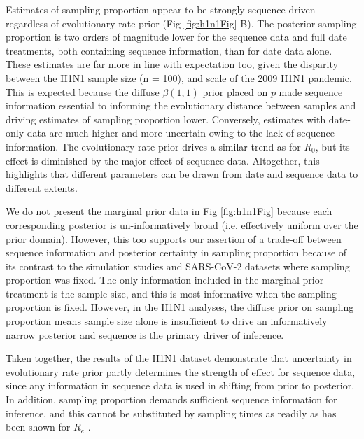 \documentclass{article}
\begin{document}
Estimates of sampling proportion appear to be strongly sequence driven regardless of evolutionary rate prior (Fig \ref{fig:h1n1Fig} B). The posterior sampling proportion is two orders of magnitude lower for the sequence data and full date treatments, both containing sequence information, than for date data alone. These estimates are far more in line with expectation too, given the disparity between the H1N1 sample size (n = 100), and scale of the 2009 H1N1 pandemic. This is expected because the diffuse $\beta(1, 1)$ prior placed on $p$ made sequence information essential to informing the evolutionary distance between samples and driving estimates of sampling proportion lower. Conversely, estimates with date-only data are much higher and more uncertain owing to the lack of sequence information. The evolutionary rate prior drives a similar trend as for $R_0$, but its effect is diminished by the major effect of sequence data. Altogether, this  highlights that different parameters can be drawn from date and sequence data to different extents. 

We do not present the marginal prior data in Fig \ref{fig:h1n1Fig} because each corresponding posterior is un-informatively broad (i.e. effectively uniform over the prior domain). However, this too supports our assertion of a trade-off between sequence information and posterior certainty in sampling proportion because of its contrast to the simulation studies and SARS-CoV-2 datasets where sampling proportion was fixed. The only information included in the marginal prior treatment is the sample size, and this is most informative when the sampling proportion is fixed. However, in the H1N1 analyses, the diffuse prior on sampling proportion means sample size alone is insufficient to drive an informatively narrow posterior and sequence is the primary driver of inference.

Taken together, the results of the H1N1 dataset demonstrate that uncertainty in evolutionary rate prior partly determines the strength of effect for sequence data, since any information in sequence data is used in shifting from prior to posterior. In addition, sampling proportion demands sufficient sequence information for inference, and this cannot be substituted by sampling times as readily as has been shown for $R_e$ \citep{Featherstone2021Infectious,volz_sampling_2014}.
\end{document}
